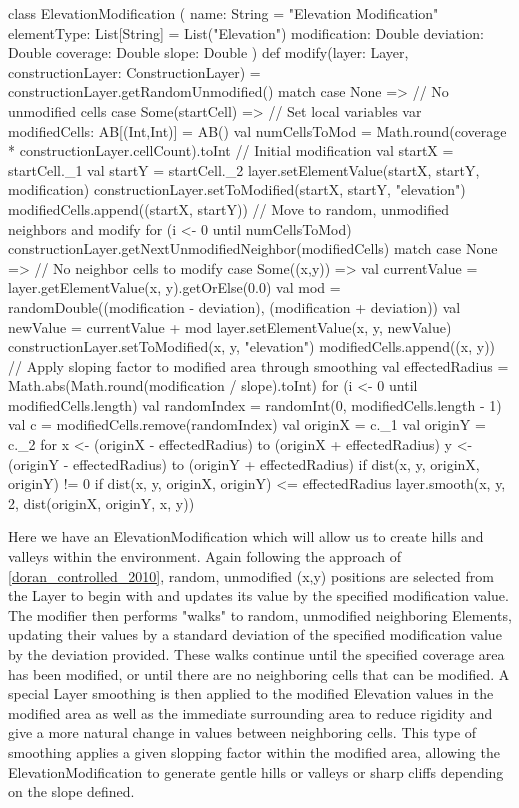 class ElevationModification (
  name: String = "Elevation Modification"
  elementType: List[String] = List("Elevation")
  modification: Double
  deviation: Double
  coverage: Double
  slope: Double
) {
  def modify(layer: Layer, constructionLayer: ConstructionLayer) = constructionLayer.getRandomUnmodified() match {
    case None => // No unmodified cells
    case Some(startCell) => {
      // Set local variables
      var modifiedCells: AB[(Int,Int)] = AB()
      val numCellsToMod = Math.round(coverage * constructionLayer.cellCount).toInt
      // Initial modification
      val startX = startCell._1
      val startY = startCell._2
      layer.setElementValue(startX, startY, modification)
      constructionLayer.setToModified(startX, startY, "elevation")
      modifiedCells.append((startX, startY))
      // Move to random, unmodified neighbors and modify
      for (i <- 0 until numCellsToMod) constructionLayer.getNextUnmodifiedNeighbor(modifiedCells) match {
        case None => // No neighbor cells to modify
        case Some((x,y)) => {
          val currentValue = layer.getElementValue(x, y).getOrElse(0.0)
          val mod = randomDouble((modification - deviation), (modification + deviation))
          val newValue = currentValue + mod
          layer.setElementValue(x, y, newValue)
          constructionLayer.setToModified(x, y, "elevation")
          modifiedCells.append((x, y))
        }
      }
      // Apply sloping factor to modified area through smoothing
      val effectedRadius = Math.abs(Math.round(modification / slope).toInt)
      for (i <- 0 until modifiedCells.length) {
        val randomIndex = randomInt(0, modifiedCells.length - 1)
        val c = modifiedCells.remove(randomIndex)
        val originX = c._1
        val originY = c._2
        for {
          x <- (originX - effectedRadius) to (originX + effectedRadius)
          y <- (originY - effectedRadius) to (originY + effectedRadius)
          if dist(x, y, originX, originY) != 0
          if dist(x, y, originX, originY) <= effectedRadius
        } layer.smooth(x, y, 2, dist(originX, originY, x, y))
      }
    }
  }
}

Here we have an ElevationModification which will allow us to create hills and valleys within the environment.
Again following the approach of \ref{doran_controlled_2010}, random, unmodified (x,y) positions are selected from the Layer to begin with and updates its value by the specified modification value.
The modifier then performs "walks" to random, unmodified neighboring Elements, updating their values by a standard deviation of the specified modification value by the deviation provided.
These walks continue until the specified coverage area has been modified, or until there are no neighboring cells that can be modified.
A special Layer smoothing is then applied to the modified Elevation values in the modified area as well as the immediate surrounding area to reduce rigidity and give a more natural change in values between neighboring cells.
This type of smoothing applies a given slopping factor within the modified area, allowing the ElevationModification to generate gentle hills or valleys or sharp cliffs depending on the slope defined.


